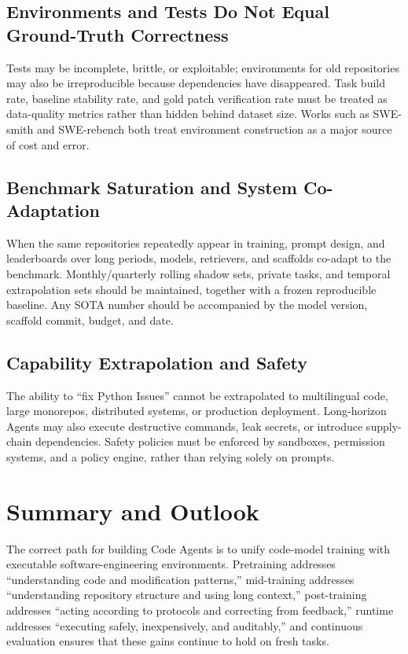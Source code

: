 \documentclass[10pt,a4paper,UTF8,fontset=none]{ctexart}
\begin{document}
\subsection{Environments and Tests Do Not Equal Ground-Truth Correctness}

Tests may be incomplete, brittle, or exploitable; environments for old repositories may also be irreproducible because dependencies have disappeared. Task build rate, baseline stability rate, and gold patch verification rate must be treated as data-quality metrics rather than hidden behind dataset size. Works such as SWE-smith and SWE-rebench both treat environment construction as a major source of cost and error\cite{en:yang2025swesmith,en:badertdinov2025swerebench}.

\subsection{Benchmark Saturation and System Co-Adaptation}

When the same repositories repeatedly appear in training, prompt design, and leaderboards over long periods, models, retrievers, and scaffolds co-adapt to the benchmark. Monthly/quarterly rolling shadow sets, private tasks, and temporal extrapolation sets should be maintained, together with a frozen reproducible baseline. Any SOTA number should be accompanied by the model version, scaffold commit, budget, and date.

\subsection{Capability Extrapolation and Safety}

The ability to ``fix Python Issues'' cannot be extrapolated to multilingual code, large monorepos, distributed systems, or production deployment. Long-horizon Agents may also execute destructive commands, leak secrets, or introduce supply-chain dependencies. Safety policies must be enforced by sandboxes, permission systems, and a policy engine, rather than relying solely on prompts.

\section{Summary and Outlook}

The correct path for building Code Agents is to unify code-model training with executable software-engineering environments. Pretraining addresses ``understanding code and modification patterns,'' mid-training addresses ``understanding repository structure and using long context,'' post-training addresses ``acting according to protocols and correcting from feedback,'' runtime addresses ``executing safely, inexpensively, and auditably,'' and continuous evaluation ensures that these gains continue to hold on fresh tasks.
\end{document}
